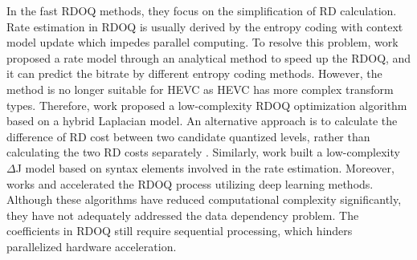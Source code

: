 \documentclass[lettersize,journal]{IEEEtran}
\begin{document}
In the fast RDOQ methods, they focus on the simplification of RD calculation. Rate estimation in RDOQ is usually derived by the entropy coding with context model update which impedes parallel computing. To resolve this problem, work \cite{huang2015efficientquantization} proposed a rate model through an analytical method to speed up the RDOQ, and it can predict the bitrate by different entropy coding methods. However, the method \cite{huang2015efficientquantization} is no longer suitable for HEVC as HEVC has more complex transform types. Therefore, work \cite{cui2017Laplacedistributionbased} proposed a low-complexity RDOQ optimization algorithm based on a hybrid Laplacian model. An alternative approach is to calculate the difference of RD cost between two candidate quantized levels, rather than calculating the two RD costs separately \cite{he2015highimplementationrdoq}. Similarly, work \cite{wang2016improvedrdoq} built a low-complexity $\Delta$J model based on syntax elements involved in the rate estimation. Moreover, works \cite{canh2018rate} and \cite{kianfar2020parallelized} accelerated the RDOQ process utilizing deep learning methods. 
Although these algorithms have reduced computational complexity significantly, they have not adequately addressed the data dependency problem. The coefficients in RDOQ still require sequential processing, which hinders parallelized hardware acceleration. 


\end{document}
